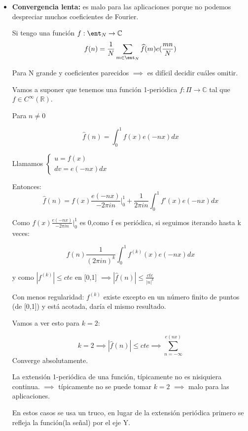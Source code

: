 \begin{itemize}
	\item \textbf{Convergencia lenta:} es malo para las aplicaciones porque no podemos despreciar muchos coeficientes de Fourier.
	
	Si tengo una función $f: \ent_N \rightarrow \mathbb{C}$
	$$f(n) = \frac{1}{N}\sum_{m \in \ent_N}\widehat{f}(m)e(\frac{mn}{N})$$
	
	Para N grande y coeficientes parecidos $\implies$ es difícil decidir cuáles omitir.
	
	Vamos a suponer que tenemos una función 1-periódica $f : \Pi \rightarrow \mathbb{C}$ tal que $f \in C^{\infty}(\mathbb{R})$.
	
	Para $n \neq 0$
	
	$$\widehat{f}(n) = \int_{0}^{1} f(x) e(-nx) dx$$
	
	Llamamos $\begin{cases}
	u = f(x)\\
	dv = e(-nx) dx
	\end{cases}$
	
	Entonces:
	$$\widehat{f}(n) = f(x) \frac{e(-nx)}{-2\pi in}|_{0}^1 + \frac{1}{2\pi i n} \int_{0}^1 f'(x) e(-nx) dx$$
	
	Como $f(x) \frac{e(-nx)}{-2\pi in}|_{0}^1 $ es 0,como f es periódica, si seguimos iterando hasta k veces:
	
	$$\widehat{f}(n)  \frac{1}{(2\pi i n)^k} \int_{0}^1 f^{(k)}(x) e(-nx) dx$$
	
	y como $|f^{(k)}| \leq cte$ en [0,1] $\implies |\widehat{f}(n)| \leq \frac{cte}{|n|^k}$
	
	Con menos regularidad: $f^{(k)}$ existe excepto en un número finito de puntos (de [0,1]) y está acotada, daría el mismo resultado.
	
	Vamos a ver esto para $k=2$:
	
	$$k=2 \implies |\widehat{f}(n)| \leq cte \implies \sum_{n= -\infty}^{e(nx)}$$
	Converge absolutamente.
	

\begin{center}
	\centering
\end{center}
	
	La extensión 1-periódica de una función, típicamente no es nisiquiera continua. $\implies$ típicamente no se puede tomar $k=2$ $\implies$ malo para las aplicaciones.
	
	En estos casos se usa un truco, en lugar de la extensión periódica primero se refleja la función(la señal) por el eje Y.
	

\end{itemize}
